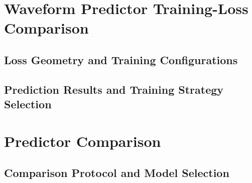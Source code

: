 \section{Waveform Predictor Training-Loss Comparison}

\subsection{Loss Geometry and Training Configurations}

\subsection{Prediction Results and Training Strategy Selection}

\section{Predictor Comparison}

\subsection{Comparison Protocol and Model Selection}


